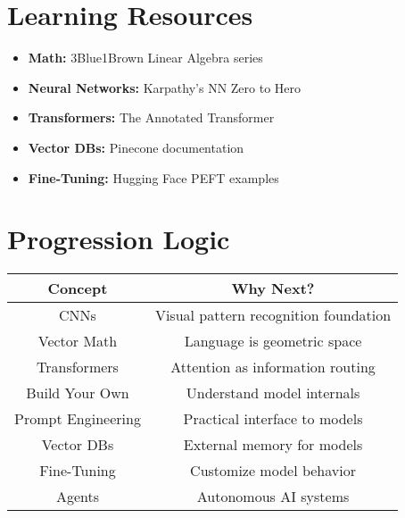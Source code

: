\documentclass{article}
\begin{document}
\section{Learning Resources}
\begin{itemize}
\item \textbf{Math:} 3Blue1Brown Linear Algebra series
\item \textbf{Neural Networks:} Karpathy's NN Zero to Hero
\item \textbf{Transformers:} The Annotated Transformer
\item \textbf{Vector DBs:} Pinecone documentation
\item \textbf{Fine-Tuning:} Hugging Face PEFT examples
\end{itemize}

\section{Progression Logic}
\begin{center}
\begin{tabular}{|c|c|}
\hline
\textbf{Concept} & \textbf{Why Next?} \\
\hline
CNNs & Visual pattern recognition foundation \\
\hline
Vector Math & Language is geometric space \\
\hline
Transformers & Attention as information routing \\
\hline
Build Your Own & Understand model internals \\
\hline
Prompt Engineering & Practical interface to models \\
\hline
Vector DBs & External memory for models \\
\hline
Fine-Tuning & Customize model behavior \\
\hline
Agents & Autonomous AI systems \\
\hline
\end{tabular}
\end{center}
\end{document}
